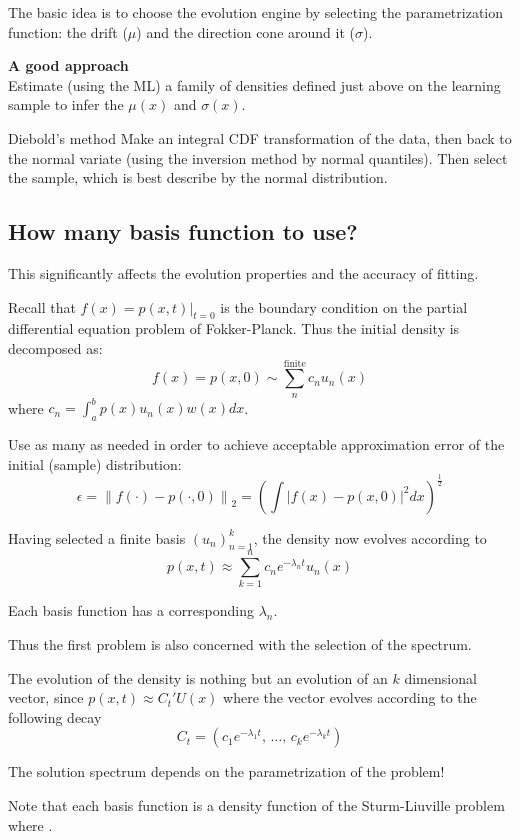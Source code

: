 \documentclass[a4paper]{article}
\newcommand{\brac}[1]{{\left ( #1 \right )}}
\newcommand{\induc}[1]{{\left . #1 \right \vert}}
\newcommand{\abs}[1]{{\left | #1 \right |}}
\newcommand{\nrm}[1]{{\left\| #1 \right \|}}
\begin{document}
The basic idea is to choose the evolution engine by selecting the parametrization function: the drift ($\mu$) and the direction cone around it ($\sigma$).

\noindent\textbf{A good approach}\hfill \\
Estimate (using the ML) a family of densities defined just above on the learning sample to infer the $\mu(x)$ and $\sigma(x)$.

Diebold's method 
Make an integral CDF transformation of the data, then back to the normal variate (using the inversion method by normal quantiles). Then select the sample, which is best describe by the normal distribution.


\subsection{How many basis function to use?} %
\label{sub:the_effective_subspace_dimension}

This significantly affects the evolution properties and the accuracy of fitting.

Recall that $f(x) = \induc{p(x,t)}_{t=0}$ is the boundary condition on the partial differential equation problem of Fokker-Planck. Thus the initial density is decomposed as:
\[f(x) = p(x, 0) \sim \sum_n^{\text{finite}} c_n u_n(x)\]
where $c_n = \int_a^b p(x) u_n(x) w(x) dx$.

Use as many as needed in order to achieve acceptable approximation error of the initial (sample) distribution:
\[\epsilon = \nrm{f(\cdot) - p(\cdot,0)}_2 = \brac{\int \abs{f(x)-p(x,0)}^2 dx}^\frac{1}{2}\]

Having selected a finite basis $\brac{u_n}_{n=1}^k$, the density now evolves according to
\[p(x,t) \approx \sum_{k=1}^n c_n e^{-\lambda_n t} u_n(x)\]

Each basis function has a corresponding $\lambda_n$.

Thus the first problem is also concerned with the selection of the spectrum.

The evolution of the density is nothing but an evolution of an $k$ dimensional vector, since $p(x, t) \approx C_t' U(x)$
where the vector evolves according to the following decay
\[C_t = \brac{ c_1 e^{-\lambda_1 t},\,\ldots,\, c_k e^{-\lambda_k t} }\]

The solution spectrum depends on the parametrization of the problem!

Note that each basis function is a density function of the Sturm-Liuville problem where .
\end{document}
